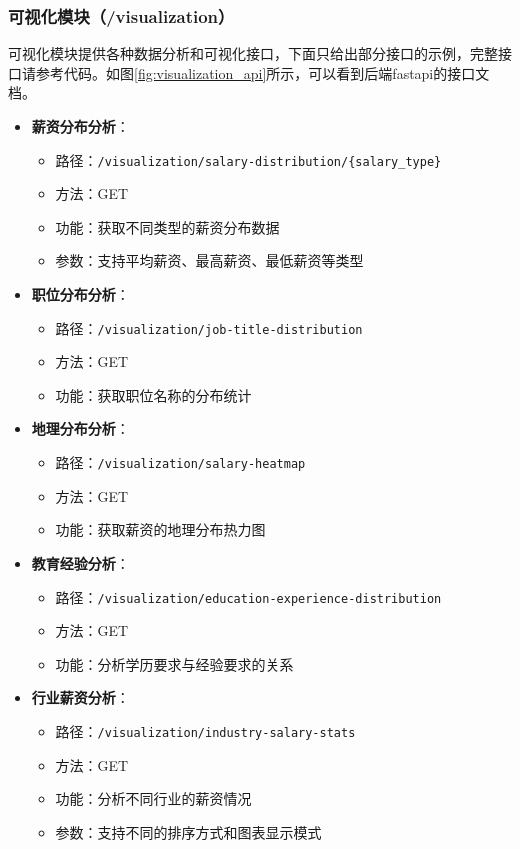 \subsubsection{可视化模块（/visualization）}
可视化模块提供各种数据分析和可视化接口，下面只给出部分接口的示例，完整接口请参考代码。如图\ref{fig:visualization_api}所示，可以看到后端fastapi的接口文档。

\begin{itemize}
    \item \textbf{薪资分布分析}：
    \begin{itemize}
        \item 路径：\texttt{/visualization/salary-distribution/\{salary\_type\}}
        \item 方法：GET
        \item 功能：获取不同类型的薪资分布数据
        \item 参数：支持平均薪资、最高薪资、最低薪资等类型
    \end{itemize}
    
    \item \textbf{职位分布分析}：
    \begin{itemize}
        \item 路径：\texttt{/visualization/job-title-distribution}
        \item 方法：GET
        \item 功能：获取职位名称的分布统计
    \end{itemize}
    
    \item \textbf{地理分布分析}：
    \begin{itemize}
        \item 路径：\texttt{/visualization/salary-heatmap}
        \item 方法：GET
        \item 功能：获取薪资的地理分布热力图
    \end{itemize}
    
    \item \textbf{教育经验分析}：
    \begin{itemize}
        \item 路径：\texttt{/visualization/education-experience-distribution}
        \item 方法：GET
        \item 功能：分析学历要求与经验要求的关系
    \end{itemize}
    
    \item \textbf{行业薪资分析}：
    \begin{itemize}
        \item 路径：\texttt{/visualization/industry-salary-stats}
        \item 方法：GET
        \item 功能：分析不同行业的薪资情况
        \item 参数：支持不同的排序方式和图表显示模式
    \end{itemize}
\end{itemize}

